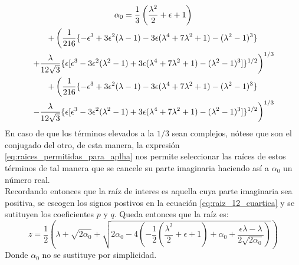 \documentclass[12pt]{article}
\begin{document}
\begin{multline}
\label{eq:alpha_diferentes_omegas_reposo}
\alpha_0 = \frac{1}{3}\left(\frac{\lambda^2}{2} + \epsilon + 1 \right)\\
+ \left(\frac{1}{216}\lbrace-\epsilon^3+3\epsilon^2(\lambda-1)-
3\epsilon(\lambda^4 +7\lambda^2 +1)- (\lambda^2 -1)^3\rbrace \right. \\
\left. +\frac{\lambda}{12\sqrt{3}}\lbrace\epsilon [\epsilon^3-3\epsilon^2(\lambda^2 -1)+3\epsilon(\lambda^4 + 7\lambda^2 +1)- (\lambda^2-1)^3]\rbrace^{1/2} \vphantom{\frac{1}{216}}\right)^{1/3}\\
+ \left(\frac{1}{216}\lbrace-\epsilon^3+3\epsilon^2(\lambda-1)-
3\epsilon(\lambda^4 +7\lambda^2 +1)- (\lambda^2 -1)^3\rbrace \right. \\
\left. -\frac{\lambda}{12\sqrt{3}}\lbrace\epsilon [\epsilon^3-3\epsilon^2(\lambda^2 -1)+3\epsilon(\lambda^4 + 7\lambda^2 +1)- (\lambda^2-1)^3]\rbrace^{1/2} \vphantom{\frac{1}{216}}\right)^{1/3}
\end{multline}
En caso de que los términos elevados a la $1/3$ sean complejos, nótese que son el conjugado del otro, de esta manera, la expresión \ref{eq:raices_permitidas_para_aplha} nos permite seleccionar las raíces de estos términos de tal manera que se cancele su parte imaginaria haciendo así a $\alpha_0$ un número real.\\
Recordando entonces que la raíz de interes es aquella cuya parte imaginaria sea positiva, se escogen los signos postivos en la ecuación \ref{eq:raiz_12_cuartica} y se sutituyen los coeficientes $p$ y $q$. Queda entonces que la raíz es:
\begin{equation}
\label{eq:raiz_diferente_omega_reposo}
z= \frac{1}{2} \left( \lambda + \sqrt{2\alpha_0} + \sqrt{2\alpha_0 -4 \left(-\frac{1}{2}(\frac{\lambda^2}{2}+\epsilon+1)+\alpha_0 +\frac{\epsilon \lambda - \lambda}{2\sqrt{2\alpha_0}}\right)}\right)
\end{equation}
Donde $\alpha_0$ no se sustituye por simplicidad.
 

\end{document}
